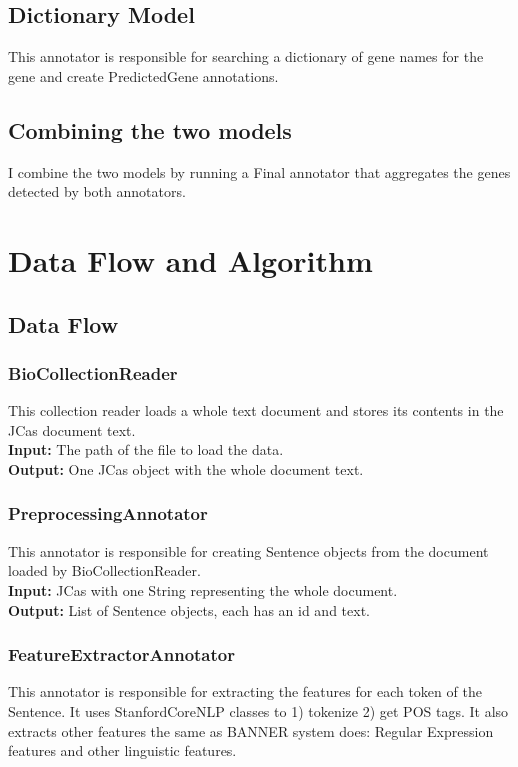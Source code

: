 \documentclass{article}
\begin{document}
\subsection{Dictionary Model}
This annotator is responsible for searching a dictionary of gene names for the gene and create PredictedGene annotations.

\subsection{Combining the two models}
I combine the two models by running a Final annotator that aggregates the genes detected by both annotators.
\section{Data Flow and Algorithm}
\subsection{Data Flow}
\subsubsection{BioCollectionReader}
This collection reader loads a whole text document and stores its contents in the JCas document text.\\
\textbf{Input:} The path of the file to load the data.\\
\textbf{Output:} One JCas object with the whole document text.


\subsubsection{PreprocessingAnnotator}
This annotator is responsible for creating Sentence objects from the document loaded by BioCollectionReader.\\
\textbf{Input:} JCas with one String representing the whole document.\\
\textbf{Output:} List of Sentence objects, each has an id and text.\\


\subsubsection{FeatureExtractorAnnotator}
This annotator is responsible for extracting the features for each token of the Sentence. It uses StanfordCoreNLP classes to 1) tokenize 2) get POS tags. It also extracts other features the same as BANNER \cite{banner_code} system does: Regular Expression features and other linguistic features.\\
\end{document}
